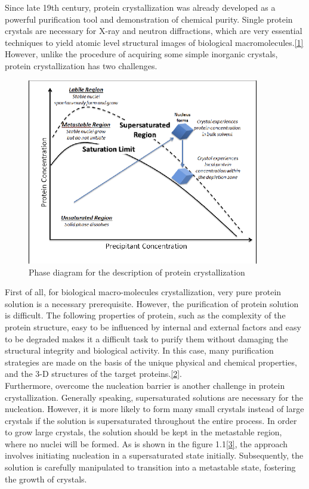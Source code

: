\documentclass[a4paper,english,12pt,bibliography=totoc]{scrreprt}
\begin{document}
Since late 19th century, protein crystallization was already developed as a powerful purification tool and demonstration of chemical purity. Single protein crystals are necessary for X-ray and neutron diffractions, which are very essential techniques to yield atomic level structural images of biological macromolecules.\hyperref[sec:ref_1]{[1]} However, unlike the procedure of acquiring some simple inorganic crystals, protein crystallization has two challenges.\\


\begin{figure}[H]
        \centering
        \includegraphics[width=0.9\textwidth]{2. First draft of protein crystalization/Images/Crystalization curves.png}
	    \caption{Phase diagram for the description of protein crystallization}
\end{figure}

First of all, for biological macro-molecules crystallization, very pure protein solution is a necessary prerequisite. However, the purification of protein solution is difficult. The following properties of protein, such as the complexity of the protein structure, easy to be influenced by internal and external factors and easy to be degraded makes it a difficult task to purify them without damaging the structural integrity and biological activity.  In this case, many purification strategies are made on the basis of the unique physical and chemical properties, and the 3-D structures of the target proteins.\hyperref[sec:ref_2]{[2]}.\\

Furthermore, overcome the nucleation barrier is another challenge in protein crystallization. Generally speaking, supersaturated solutions are necessary for the nucleation. However, it is more likely to form many small crystals instead of large crystals if the solution is supersaturated throughout the entire process. In order to grow large crystals, the solution should be kept in the metastable region, where no nuclei will be formed. As is shown in the figure 1.1\hyperref[sec:ref_3]{[3]}, the approach involves initiating nucleation in a supersaturated state initially. Subsequently, the solution is carefully manipulated to transition into a metastable state, fostering the growth of crystals.\\
\end{document}
